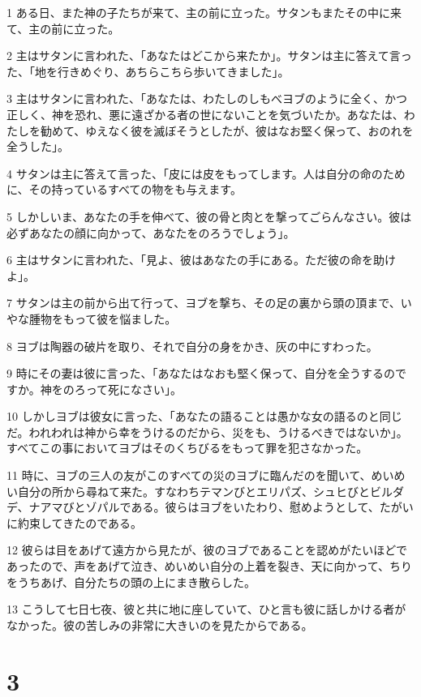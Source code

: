 \par 1 ある日、また神の子たちが来て、主の前に立った。サタンもまたその中に来て、主の前に立った。
\par 2 主はサタンに言われた、「あなたはどこから来たか」。サタンは主に答えて言った、「地を行きめぐり、あちらこちら歩いてきました」。
\par 3 主はサタンに言われた、「あなたは、わたしのしもべヨブのように全く、かつ正しく、神を恐れ、悪に遠ざかる者の世にないことを気づいたか。あなたは、わたしを勧めて、ゆえなく彼を滅ぼそうとしたが、彼はなお堅く保って、おのれを全うした」。
\par 4 サタンは主に答えて言った、「皮には皮をもってします。人は自分の命のために、その持っているすべての物をも与えます。
\par 5 しかしいま、あなたの手を伸べて、彼の骨と肉とを撃ってごらんなさい。彼は必ずあなたの顔に向かって、あなたをのろうでしょう」。
\par 6 主はサタンに言われた、「見よ、彼はあなたの手にある。ただ彼の命を助けよ」。
\par 7 サタンは主の前から出て行って、ヨブを撃ち、その足の裏から頭の頂まで、いやな腫物をもって彼を悩ました。
\par 8 ヨブは陶器の破片を取り、それで自分の身をかき、灰の中にすわった。
\par 9 時にその妻は彼に言った、「あなたはなおも堅く保って、自分を全うするのですか。神をのろって死になさい」。
\par 10 しかしヨブは彼女に言った、「あなたの語ることは愚かな女の語るのと同じだ。われわれは神から幸をうけるのだから、災をも、うけるべきではないか」。すべてこの事においてヨブはそのくちびるをもって罪を犯さなかった。
\par 11 時に、ヨブの三人の友がこのすべての災のヨブに臨んだのを聞いて、めいめい自分の所から尋ねて来た。すなわちテマンびとエリパズ、シュヒびとビルダデ、ナアマびとゾパルである。彼らはヨブをいたわり、慰めようとして、たがいに約束してきたのである。
\par 12 彼らは目をあげて遠方から見たが、彼のヨブであることを認めがたいほどであったので、声をあげて泣き、めいめい自分の上着を裂き、天に向かって、ちりをうちあげ、自分たちの頭の上にまき散らした。
\par 13 こうして七日七夜、彼と共に地に座していて、ひと言も彼に話しかける者がなかった。彼の苦しみの非常に大きいのを見たからである。

\chapter{3}

